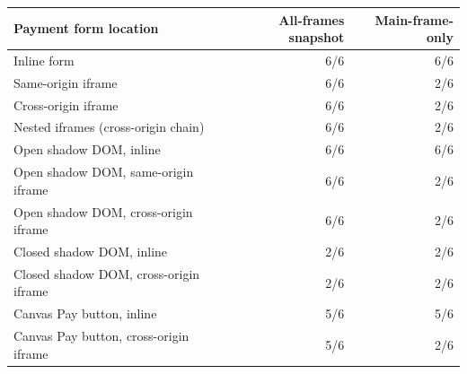 \begin{tabular}{lrr}
\toprule
Payment form location & All-frames snapshot & Main-frame-only \\
\midrule
Inline form & 6/6 & 6/6 \\
Same-origin iframe & 6/6 & 2/6 \\
Cross-origin iframe & 6/6 & 2/6 \\
Nested iframes (cross-origin chain) & 6/6 & 2/6 \\
Open shadow DOM, inline & 6/6 & 6/6 \\
Open shadow DOM, same-origin iframe & 6/6 & 2/6 \\
Open shadow DOM, cross-origin iframe & 6/6 & 2/6 \\
Closed shadow DOM, inline & 2/6 & 2/6 \\
Closed shadow DOM, cross-origin iframe & 2/6 & 2/6 \\
Canvas Pay button, inline & 5/6 & 5/6 \\
Canvas Pay button, cross-origin iframe & 5/6 & 2/6 \\
\bottomrule
\end{tabular}
